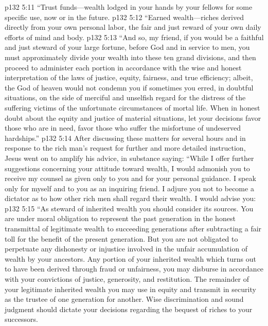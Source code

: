 \vs p132 5:11 \textcolor{ubdarkred}{“\bibnobreakspace Trust funds---wealth lodged in your hands by your fellows for some specific use, now or in the future.}
\vs p132 5:12 \textcolor{ubdarkred}{“\bibnobreakspace Earned wealth---riches derived directly from your own personal labor, the fair and just reward of your own daily efforts of mind and body.}
\pc \vs p132 5:13 \textcolor{ubdarkred}{“And so, my friend, if you would be a faithful and just steward of your large fortune, before God and in service to men, you must approximately divide your wealth into these ten grand divisions, and then proceed to administer each portion in accordance with the wise and honest interpretation of the laws of justice, equity, fairness, and true efficiency; albeit, the God of heaven would not condemn you if sometimes you erred, in doubtful situations, on the side of merciful and unselfish regard for the distress of the suffering victims of the unfortunate circumstances of mortal life. When in honest doubt about the equity and justice of material situations, let your decisions favor those who are in need, favor those who suffer the misfortune of undeserved hardships.”}
\vs p132 5:14 After discussing these matters for several hours and in response to the rich man’s request for further and more detailed instruction, Jesus went on to amplify his advice, in substance saying: \textcolor{ubdarkred}{“While I offer further suggestions concerning your attitude toward wealth, I would admonish you to receive my counsel as given only to you and for your personal guidance. I speak only for myself and to you as an inquiring friend. I adjure you not to become a dictator as to how other rich men shall regard their wealth. I would advise you:}
\pc \vs p132 5:15 \textcolor{ubdarkred}{“\bibnobreakspace As steward of inherited wealth you should consider its sources. You are under moral obligation to represent the past generation in the honest transmittal of legitimate wealth to succeeding generations after subtracting a fair toll for the benefit of the present generation. But you are not obligated to perpetuate any dishonesty or injustice involved in the unfair accumulation of wealth by your ancestors. Any portion of your inherited wealth which turns out to have been derived through fraud or unfairness, you may disburse in accordance with your convictions of justice, generosity, and restitution. The remainder of your legitimate inherited wealth you may use in equity and transmit in security as the trustee of one generation for another. Wise discrimination and sound judgment should dictate your decisions regarding the bequest of riches to your successors.}
